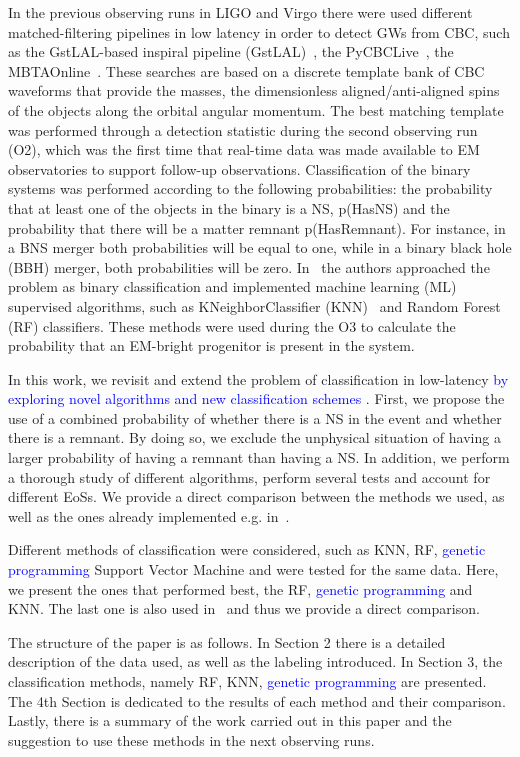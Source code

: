  
In the previous observing runs in LIGO and Virgo there were used different 
matched-filtering pipelines in low latency in order to detect GWs from CBC, 
such as the GstLAL-based inspiral pipeline (GstLAL)~\cite{Sachdev:2020lfd}, 
the PyCBCLive~\cite{Nitz_2018}, the MBTAOnline~\cite{Adams_2016}. 
These searches are based on a discrete template bank of CBC waveforms 
that provide the masses, the dimensionless aligned/anti-aligned spins of the 
objects along the orbital angular momentum. The best matching template 
was performed through a detection statistic during the second observing run 
(O2), which was the first time that real-time data was made available to EM 
observatories to support follow-up observations. Classification of the binary 
systems was performed according to the following probabilities: the 
probability that at least one of the objects in the binary is a NS, p(HasNS) 
and the probability that there will be a matter remnant p(HasRemnant). For 
instance, in a BNS merger both probabilities will be equal to one, while in a 
binary black hole (BBH) merger, both probabilities will be zero. 
In~\cite{Chatterjee:2019avs} the authors approached the problem as binary 
classification and implemented machine learning (ML) supervised algorithms, 
such as KNeighborClassifier (KNN)~\cite{Pedregosa:2011ork} and Random 
Forest (RF) classifiers. These methods were used during the O3 to 
calculate the probability that an EM-bright progenitor is present in the 
system.


In this work, we revisit and extend the problem of classification in low-latency\textcolor{blue}{ by exploring novel algorithms and new classification schemes }. First, we propose the use of a combined probability of whether there is a NS 
in the event and whether there is a remnant. By doing so, we exclude the 
unphysical situation of having a larger probability of having a remnant than 
having a NS. In addition, we perform a thorough study of different algorithms, 
perform several tests and account for different EoSs. We provide a direct 
comparison between the methods we used, as well as the ones already 
implemented e.g. in~\cite{Chatterjee:2019avs}. 

Different methods of classification were considered, such as KNN, RF, \textcolor{blue}{genetic programming} 
Support Vector Machine and were tested for the same data. Here, we 
present the ones that performed best, the RF, \textcolor{blue}{genetic programming} and KNN. The last one is 
also used in~\cite{Chatterjee:2019avs} and thus we provide a direct 
comparison. 

The structure of the paper is as follows. In Section 2 there is a detailed 
description of the data used, as well as the labeling introduced. In 
Section 3, the classification methods, namely RF, KNN, \textcolor{blue}{genetic programming}  are presented. 
The 4th Section is dedicated to the results of each method and their 
comparison. Lastly, there is a summary of the work carried out in this 
paper and the suggestion to use these methods in the next observing 
runs.
